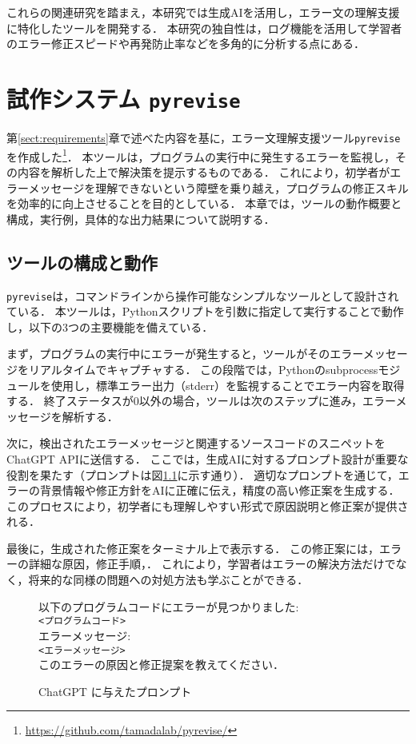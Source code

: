 \documentclass[12pt,twoside]{jbook}
\newcommand{\pyrevise}{\texttt{pyrevise}}
\begin{document}
これらの関連研究を踏まえ，本研究では生成AIを活用し，エラー文の理解支援に特化したツールを開発する．
本研究の独自性は，ログ機能を活用して学習者のエラー修正スピードや再発防止率などを多角的に分析する点にある．

\chapter{試作システム \pyrevise}

第\ref{sect:requirements}章で述べた内容を基に，エラー文理解支援ツール\pyrevise を作成した\footnote{\url{https://github.com/tamadalab/pyrevise/}}．
本ツールは，プログラムの実行中に発生するエラーを監視し，その内容を解析した上で解決策を提示するものである．
これにより，初学者がエラーメッセージを理解できないという障壁を乗り越え，プログラムの修正スキルを効率的に向上させることを目的としている．
本章では，ツールの動作概要と構成，実行例，具体的な出力結果について説明する．

\section{ツールの構成と動作}
\pyrevise は，コマンドラインから操作可能なシンプルなツールとして設計されている．
本ツールは，Pythonスクリプトを引数に指定して実行することで動作し，以下の3つの主要機能を備えている．

まず，プログラムの実行中にエラーが発生すると，ツールがそのエラーメッセージをリアルタイムでキャプチャする．
この段階では，Pythonのsubprocessモジュールを使用し，標準エラー出力（stderr）を監視することでエラー内容を取得する．
終了ステータスが0以外の場合，ツールは次のステップに進み，エラーメッセージを解析する．

次に，検出されたエラーメッセージと関連するソースコードのスニペットをChatGPT APIに送信する．
ここでは，生成AIに対するプロンプト設計が重要な役割を果たす（プロンプトは図\ref{fig:prompt}に示す通り）．
適切なプロンプトを通じて，エラーの背景情報や修正方針をAIに正確に伝え，精度の高い修正案を生成する．
このプロセスにより，初学者にも理解しやすい形式で原因説明と修正案が提供される．

最後に，生成された修正案をターミナル上で表示する．
この修正案には，エラーの詳細な原因，修正手順，．
これにより，学習者はエラーの解決方法だけでなく，将来的な同様の問題への対処方法も学ぶことができる．

\begin{figure}
  \centering
  {\footnotesize
  \begin{boxedminipage}{1.02\columnwidth}
以下のプログラムコードにエラーが見つかりました:\\
\verb!<プログラムコード>!\\
エラーメッセージ:\\
\verb!<エラーメッセージ>!\\
このエラーの原因と修正提案を教えてください．
  \end{boxedminipage}}
  \caption{ChatGPT に与えたプロンプト}\label{fig:prompt}
  \vspace{0.2cm}
\end{figure}
\end{document}
